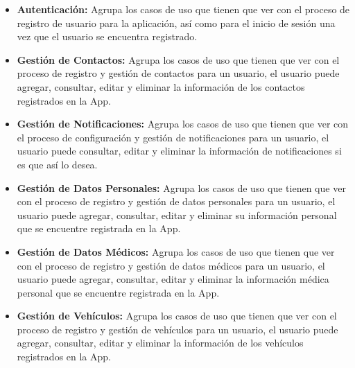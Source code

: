 \begin{itemize}
	\item {\bf Autenticación:} Agrupa los casos de uso que tienen que ver con el proceso de registro de usuario para la aplicación, así como para el inicio de sesión una vez que el usuario se encuentra registrado.
	
	\item {\bf Gestión de Contactos:} Agrupa los casos de uso que tienen que ver con el proceso de registro y gestión de contactos para un usuario, el usuario puede agregar, consultar, editar y eliminar la información de los contactos registrados en la App.
	
	\item {\bf Gestión de Notificaciones:} Agrupa los casos de uso que tienen que ver con el proceso de configuración y gestión de notificaciones para un usuario, el usuario puede consultar, editar y eliminar la información de notificaciones si es que así lo desea.
	
	\item {\bf Gestión de Datos Personales:} Agrupa los casos de uso que tienen que ver con el proceso de registro y gestión de datos personales para un usuario, el usuario puede agregar, consultar, editar y eliminar su información personal que se encuentre registrada en la App.
	
	\item {\bf Gestión de Datos Médicos:} Agrupa los casos de uso que tienen que ver con el proceso de registro y gestión de datos médicos para un usuario, el usuario puede agregar, consultar, editar y eliminar la información médica personal que se encuentre registrada en la App.
	
	\item {\bf Gestión de Vehículos:} Agrupa los casos de uso que tienen que ver con el proceso de registro y gestión de vehículos para un usuario, el usuario puede agregar, consultar, editar y eliminar la información de los vehículos registrados en la App.
\end{itemize}
